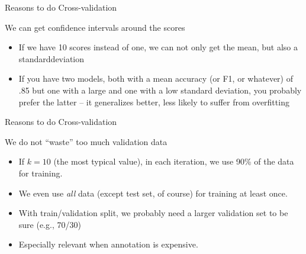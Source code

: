 \begin{frame}{Reasons to do Cross-validation}
  \begin{block}{We can get confidence intervals around the scores}
    \begin{itemize}
    \item If we have 10 scores instead of one, we can not only get the mean, but also a standarddeviation
    \item If you have two models, both with a mean accuracy (or F1, or whatever) of .85 but one with a large and one with a low standard deviation, you probably prefer the latter -- it generalizes better, less likely to suffer from overfitting
    \end{itemize}	
  \end{block}
  
\end{frame}






\begin{frame}{Reasons to do Cross-validation}
  \begin{block}{We do not ``waste'' too much validation data}
    \begin{itemize}
    \item If $k=10$ (the most typical value), in each iteration, we use 90\% of the data for training.
    \item We even use \emph{all} data (except test set, of course) for training at least once.
    \item With train/validation split, we probably need a larger validation set to be sure (e.g., 70/30)
    \item Especially relevant when annotation is expensive.
    \end{itemize}
  \end{block}
\end{frame}



